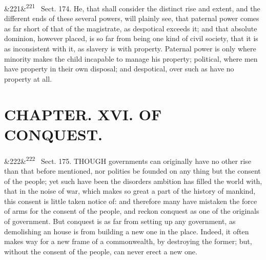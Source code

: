 \documentclass[12pt]{article}
\newcommand{\para}[1][]{\par\noindent\ifx&#1&\else\textsuperscript{\footnotesize #1}~\fi}
\begin{document}
\para[221] Sect. 174. He, that shall consider the distinct rise and extent, and the different ends of these several powers, will plainly see, that paternal power comes as far short of that of the magistrate, as despotical exceeds it; and that absolute dominion, however placed, is so far from being one kind of civil society, that it is as inconsistent with it, as slavery is with property. Paternal power is only where minority makes the child incapable to manage his property; political, where men have property in their own disposal; and despotical, over such as have no property at all.

\section*{CHAPTER. XVI. OF CONQUEST.}

\para[222] Sect. 175. THOUGH governments can originally have no other rise than that before mentioned, nor polities be founded on any thing but the consent of the people; yet such have been the disorders ambition has filled the world with, that in the noise of war, which makes so great a part of the history of mankind, this consent is little taken notice of: and therefore many have mistaken the force of arms for the consent of the people, and reckon conquest as one of the originals of government. But conquest is as far from setting up any government, as demolishing an house is from building a new one in the place. Indeed, it often makes way for a new frame of a commonwealth, by destroying the former; but, without the consent of the people, can never erect a new one.
\end{document}

